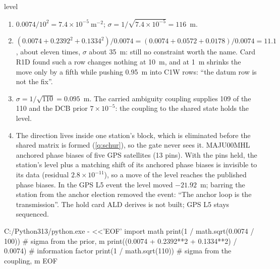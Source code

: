 \begin{answer}{level}
\solution
\begin{enumerate}[leftmargin=*, itemsep=1pt]
\item $0.0074/10^2 = 7.4\times10^{-5}~\mathrm{m}^{-2}$; $\sigma = 1/\sqrt{7.4\times10^{-5}} =
      116$~m.
\item $(0.0074 + 0.2392^2 + 0.1334^2)/0.0074 = (0.0074 + 0.0572 + 0.0178)/0.0074 = 11.1$,
      about eleven times, $\sigma$ about 35~m: still no constraint worth the name. Card
      R1D found such a row changes nothing at 10~m, and at 1~m shrinks the move only by
      a fifth while pushing 0.95~m into C1W rows: ``the datum row is not the fix''.
\item $\sigma = 1/\sqrt{110} = 0.095$~m. The carried ambiguity coupling supplies 109 of
      the 110 and the DCB prior $7\times10^{-5}$: the coupling to the shared state holds
      the level.
\item The direction lives inside one station's block, which is eliminated before the
      shared matrix is formed (\cref{q:schur}), so the gate never sees it. MAJU00MHL
      anchored phase biases of five GPS satellites (13 pins). With the pins held, the
      station's level plus a matching shift of its anchored phase biases is invisible
      to its data (residual $2.8\times10^{-11}$), so a move of the level reaches the
      published phase biases. In the GPS L5 event the level moved $-21.92$~m; barring
      the station from the anchor election removed the event: ``The anchor loop is
      the transmission''. The hold card ALD derives is not built; GPS L5 stays
      sequenced.
\end{enumerate}
\chk
\begin{cmd}
C:/Python313/python.exe - <<'EOF'
import math
print(1 / math.sqrt(0.0074 / 100))                   # sigma from the prior, m
print((0.0074 + 0.2392**2 + 0.1334**2) / 0.0074)      # information factor
print(1 / math.sqrt(110))                            # sigma from the coupling, m
EOF
\end{cmd}
\end{answer}
